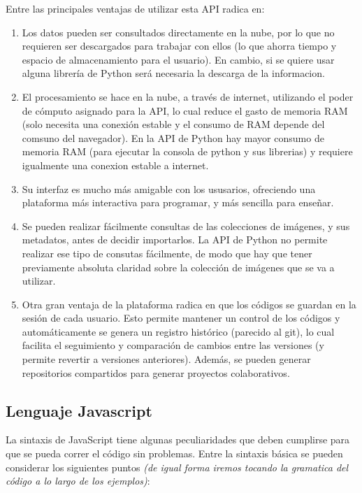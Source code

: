 \documentclass[
]{article}
\providecommand{\tightlist}{%
  \setlength{\itemsep}{0pt}\setlength{\parskip}{0pt}}
\begin{document}
Entre las principales ventajas de utilizar esta API radica en:

\begin{enumerate}
\def\labelenumi{\arabic{enumi}.}
\tightlist
\item
  Los datos pueden ser consultados directamente en la nube, por lo que
  no requieren ser descargados para trabajar con ellos (lo que ahorra
  tiempo y espacio de almacenamiento para el usuario). En cambio, si se
  quiere usar alguna librería de Python será necesaria la descarga de la
  informacion.
\item
  El procesamiento se hace en la nube, a través de internet, utilizando
  el poder de cómputo asignado para la API, lo cual reduce el gasto de
  memoria RAM (solo necesita una conexión estable y el consumo de RAM
  depende del comsuno del navegador). En la API de Python hay mayor
  consumo de memoria RAM (para ejecutar la consola de python y sus
  librerias) y requiere igualmente una conexion estable a internet.
\item
  Su interfaz es mucho más amigable con los ususarios, ofreciendo una
  plataforma más interactiva para programar, y más sencilla para
  enseñar.
\item
  Se pueden realizar fácilmente consultas de las colecciones de
  imágenes, y sus metadatos, antes de decidir importarlos. La API de
  Python no permite realizar ese tipo de consutas fácilmente, de modo
  que hay que tener previamente absoluta claridad sobre la colección de
  imágenes que se va a utilizar.
\item
  Otra gran ventaja de la plataforma radica en que los códigos se
  guardan en la sesión de cada usuario. Esto permite mantener un control
  de los códigos y automáticamente se genera un registro histórico
  (parecido al git), lo cual facilita el seguimiento y comparación de
  cambios entre las versiones (y permite revertir a versiones
  anteriores). Además, se pueden generar repositorios compartidos para
  generar proyectos colaborativos.
\end{enumerate}

\hypertarget{lenguaje-javascript}{%
\subsection{Lenguaje Javascript}\label{lenguaje-javascript}}

La sintaxis de JavaScript tiene algunas peculiaridades que deben
cumplirse para que se pueda correr el código sin problemas. Entre la
sintaxis básica se pueden considerar los siguientes puntos \emph{(de
igual forma iremos tocando la gramatica del código a lo largo de los
ejemplos)}:
\end{document}
